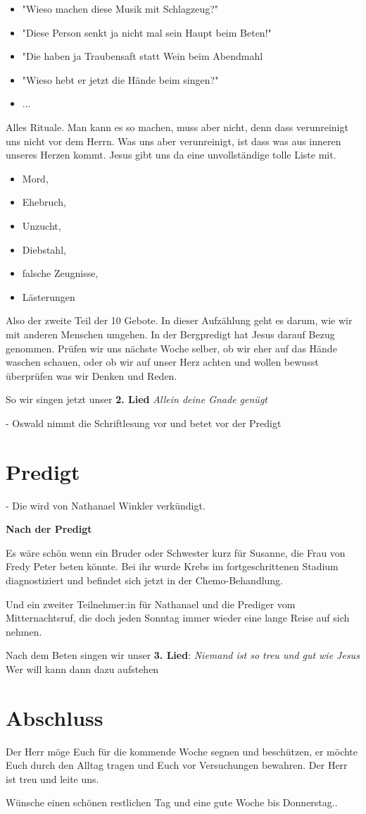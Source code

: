 \begin{itemize}
    \item "Wieso machen diese Musik mit Schlagzeug?" 
    \item "Diese Person senkt ja nicht mal sein Haupt beim Beten!"
    \item "Die haben ja Traubensaft statt Wein beim Abendmahl
    \item "Wieso hebt er jetzt die Hände beim singen?"
    \item ...
\end{itemize}
Alles Rituale. Man kann es so machen, muss aber nicht, denn dass verunreinigt uns nicht vor dem Herrn. 
Was uns aber verunreinigt, ist dass was aus inneren unseres Herzen kommt. Jesus gibt uns da eine unvollständige tolle Liste mit.
\begin{itemize}
    \item Mord, 
    \item Ehebruch, 
    \item Unzucht, 
    \item Diebstahl, 
    \item falsche Zeugnisse, 
    \item Lästerungen
\end{itemize}
Also der zweite Teil der 10 Gebote. In dieser Aufzählung geht es darum, wie wir mit anderen Menschen umgehen. In der Bergpredigt hat Jesus darauf Bezug genommen. Prüfen wir uns nächste Woche selber, ob wir eher auf das Hände waschen schauen, oder ob wir auf unser Herz achten und wollen bewusst überprüfen was wir Denken und Reden.

So wir singen jetzt unser \textbf{2. Lied} \textit{Allein deine Gnade genügt}

- Oswald nimmt die Schriftlesung vor und betet vor der Predigt

\section{Predigt}
- Die wird von Nathanael Winkler verkündigt.

\textbf{Nach der Predigt}

Es wäre schön wenn ein Bruder oder Schwester kurz für Susanne, die Frau von Fredy Peter beten könnte. 
Bei ihr wurde Krebs im fortgeschrittenen Stadium diagnostiziert und befindet sich jetzt in der Chemo-Behandlung.

Und ein zweiter Teilnehmer:in für Nathanael und die Prediger vom Mitternachtsruf, die doch jeden Sonntag immer wieder eine lange Reise auf sich nehmen.

Nach dem Beten singen wir unser \textbf{3. Lied}: \textit{Niemand ist so treu und gut wie Jesus}
Wer will kann dann dazu aufstehen

\section{Abschluss}

Der Herr möge Euch für die kommende Woche segnen und beschützen, er möchte Euch durch den Alltag tragen und Euch vor Versuchungen bewahren. Der Herr ist treu und leite uns.

Wünsche einen schönen restlichen Tag und eine gute Woche bis Donnerstag..
